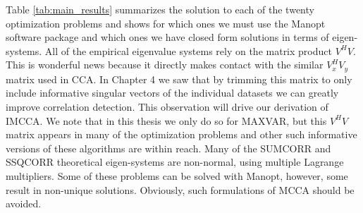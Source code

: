 Table \ref{tab:main_results} summarizes the solution to each of the twenty optimization
problems and shows for which ones we must use the Manopt software package and which ones
we have closed form solutions in terms of eigen-systems.  All of the empirical eigenvalue
systems rely on the matrix product $V^HV$. This is wonderful news because it directly
makes contact with the similar $V_x^HV_y$ matrix used in CCA. In Chapter 4 we saw that by
trimming this matrix to only include informative singular vectors of the individual
datasets we can greatly improve correlation detection. This observation will drive our
derivation of IMCCA. We note that in this thesis we only do so for MAXVAR, but this $V^HV$
matrix appears in many of the optimization problems and other such informative versions of
these algorithms are within reach. Many of the SUMCORR and SSQCORR theoretical
eigen-systems are non-normal, using multiple Lagrange multipliers. Some of these problems
can be solved with Manopt, however, some result in non-unique solutions. Obviously, such
formulations of MCCA should be avoided.

